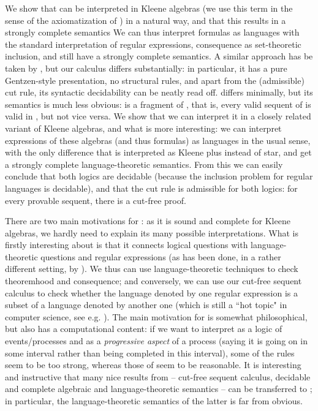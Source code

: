 \documentclass{eptcs}
\begin{document}
We show that  can be interpreted in Kleene algebras (we use this
term in the sense of the axiomatization of \cite{kozen:kleene}) in a
natural way, and that this results in a strongly complete semantics
We can thus interpret formulas as languages with the standard interpretation
of regular expressions, consequence as set-theoretic inclusion,
and still have a strongly complete semantics. 
A similar approach has be taken by \cite{kozen:substructural}, but our
calculus differs substantially: in particular, it has a pure
Gentzen-style presentation, no structural rules, and apart from the (admissible) 
cut rule, its syntactic decidability can be neatly read off.
 differs minimally, but its semantics is much
less obvious:  is a fragment of , that is, every
valid sequent of  is valid in , but not vice versa. 
We show that
we can interpret it in a closely related variant of Kleene algebras,
and what is more interesting: we can interpret  expressions of these
algebras (and thus  formulas) 
as languages in the usual sense, with the only difference
that  is interpreted as Kleene plus instead of star, and get a
strongly complete language-theoretic semantics. From this we can easily
conclude that both logics are decidable (because the inclusion problem
for regular languages is decidable), and that the cut rule
is admissible for both logics: for every provable sequent, there is a
cut-free proof.

There are two main motivations for : as it is sound and complete
for Kleene algebras, we hardly need to explain its many possible
interpretations. What is firstly interesting about  is that it connects
logical questions with language-theoretic questions and regular expressions
(as has been done, in a rather different setting, by
\cite{babu:chop}). We thus can use language-theoretic
techniques to check theoremhood and consequence; and conversely, we can
use our cut-free sequent calculus to check whether the language denoted
by one regular expression is a subset of a language denoted by another 
one (which is still a ``hot topic" in computer science, see e.g.
\cite{hovland:inclusion}).
The main motivation for  is somewhat philosophical, but also
has a computational content: if we want to
interpret  as a logic of events/processes and  as a \textit{progressive
aspect} of a process (saying it is going on in some interval
rather than being completed in this interval), 
some of the  rules seem to be too strong,
whereas those of  seem to be reasonable. It is interesting and
instructive that many nice results from  -- cut-free sequent
calculus, decidable and complete algebraic and language-theoretic
semantics -- can be transferred to ; in particular, the
language-theoretic semantics of the latter is far from obvious.
\end{document}
